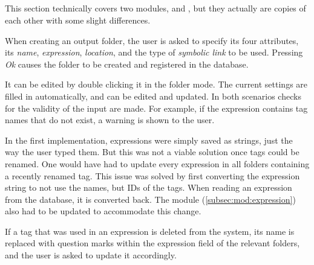 \subsection{}
\def\kapitelautor{Erik Ritschl}

\begin{sloppypar}
	This section technically covers two modules,  and , but they actually are copies of each other with some slight differences. 
\end{sloppypar}

When creating an output folder, the user is asked to specify its four attributes, its \emph{name}, \emph{expression}, \emph{location}, and the type of \emph{symbolic link} to be used. Pressing \emph{Ok} causes the folder to be created and registered in the database.

It can be edited by double clicking it in the folder mode. The current settings are filled in automatically, and can be edited and updated. In both scenarios checks for the validity of the input are made. For example, if the expression contains tag names that do not exist, a warning is shown to the user. 

In the first implementation, expressions were simply saved as strings, just the way the user typed them. But this was not a viable solution once tags could be renamed. One would have had to update every expression in all folders containing a recently renamed tag. This issue was solved by first converting the expression string to not use the names, but IDs of the tags. When reading an expression from the database, it is converted back. The  module (\cref{subsec:mod:expression}) also had to be updated to accommodate this change. 

If a tag that was used in an expression is deleted from the system, its name is replaced with question marks within the expression field of the relevant folders, and the user is asked to update it accordingly.